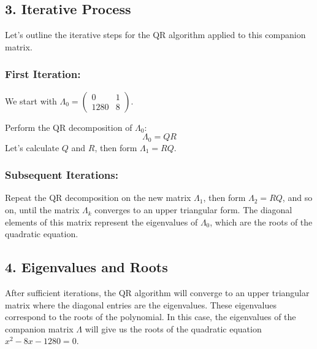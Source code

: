 \documentclass[journal]{IEEEtran}
\begin{document}
\subsection*{3. Iterative Process}
Let's outline the iterative steps for the QR algorithm applied to this companion matrix.

\subsubsection*{First Iteration:}
We start with \( \Lambda_0 = \begin{pmatrix} 0 & 1 \\ 1280 & 8 \end{pmatrix} \).

Perform the QR decomposition of \( \Lambda_0 \):
\[
\Lambda_0 = QR
\]
Let's calculate \( Q \) and \( R \), then form \( \Lambda_1 = RQ \).

\subsubsection*{Subsequent Iterations:}
Repeat the QR decomposition on the new matrix \( \Lambda_1 \), then form \( \Lambda_2 = RQ \), and so on, until the matrix \( \Lambda_k \) converges to an upper triangular form. The diagonal elements of this matrix represent the eigenvalues of \( \Lambda_0 \), which are the roots of the quadratic equation.

\subsection*{4. Eigenvalues and Roots}
After sufficient iterations, the QR algorithm will converge to an upper triangular matrix where the diagonal entries are the eigenvalues. These eigenvalues correspond to the roots of the polynomial. In this case, the eigenvalues of the companion matrix \( \Lambda \) will give us the roots of the quadratic equation \( x^2 - 8x - 1280 = 0 \).
\end{document}
